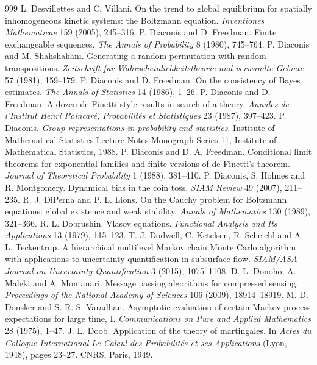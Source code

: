 \begin{thebibliography}{999}
 L. Desvillettes and C. Villani. On the trend to global equilibrium for spatially inhomogeneous kinetic systems: the Boltzmann equation. \emph{Inventiones Mathematicae} 159 (2005), 245--316.
 P. Diaconis and D. Freedman. Finite exchangeable sequences. \emph{The Annals of Probability} 8 (1980), 745--764.
 P. Diaconis and M. Shahshahani. Generating a random permutation with random transpositions. \emph{Zeitschrift f\"ur Wahrscheinlichkeitstheorie und verwandte Gebiete} 57 (1981), 159--179.
 P. Diaconis and D. Freedman. On the consistency of Bayes estimates. \emph{The Annals of Statistics} 14 (1986), 1--26.
 P. Diaconis and D. Freedman. A dozen de Finetti style results in search of a theory. \emph{Annales de l'Institut Henri Poincar\'e, Probabilit\'es et Statistiques} 23 (1987), 397--423.
 P. Diaconis. \emph{Group representations in probability and statistics}. Institute of Mathematical Statistics Lecture Notes Monograph Series 11, Institute of Mathematical Statistics, 1988.
 P. Diaconis and D. A. Freedman. Conditional limit theorems for exponential families and finite versions of de Finetti's theorem. \emph{Journal of Theoretical Probability} 1 (1988), 381--410.
 P. Diaconis, S. Holmes and R. Montgomery. Dynamical bias in the coin toss. \emph{SIAM Review} 49 (2007), 211--235.
 R. J. DiPerna and P. L. Lions. On the Cauchy problem for Boltzmann equations: global existence and weak stability. \emph{Annals of Mathematics} 130 (1989), 321--366.
 R. L. Dobrushin. Vlasov equations. \emph{Functional Analysis and Its Applications} 13 (1979), 115--123.
 T. J. Dodwell, C. Ketelsen, R. Scheichl and A. L. Teckentrup. A hierarchical multilevel Markov chain Monte Carlo algorithm with applications to uncertainty quantification in subsurface flow. \emph{SIAM/ASA Journal on Uncertainty Quantification} 3 (2015), 1075--1108.
 D. L. Donoho, A. Maleki and A. Montanari. Message passing algorithms for compressed sensing. \emph{Proceedings of the National Academy of Sciences} 106 (2009), 18914--18919.
 M. D. Donsker and S. R. S. Varadhan. Asymptotic evaluation of certain Markov process expectations for large time, I. \emph{Communications on Pure and Applied Mathematics} 28 (1975), 1--47.
 J. L. Doob. Application of the theory of martingales. In \emph{Actes du Colloque International Le Calcul des Probabilit\'es et ses Applications} (Lyon, 1948), pages 23--27. CNRS, Paris, 1949.

\end{thebibliography}
